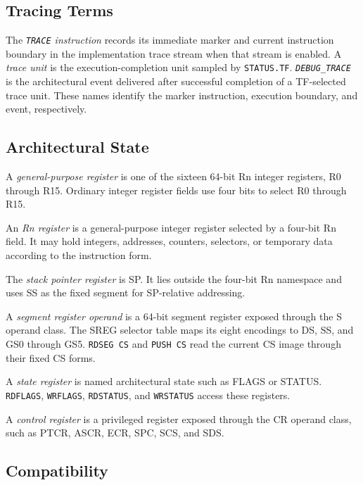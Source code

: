 \subsection{Tracing Terms}\label{section:tracing-terminology}

The \emph{\texttt{TRACE} instruction} records its immediate marker and current instruction boundary in the
implementation trace stream when that stream is enabled. A \emph{trace unit} is the execution-completion unit
sampled by \texttt{STATUS.TF}. \emph{\texttt{DEBUG\_TRACE}} is the architectural event delivered after successful
completion of a TF-selected trace unit. These names identify the marker instruction, execution boundary, and event,
respectively.

\subsection{Architectural State}\label{section:architectural-state-terminology}

A \emph{general-purpose register} is one of the sixteen 64-bit Rn integer registers, R0 through R15. Ordinary
integer register fields use four bits to select R0 through R15.

An \emph{Rn register} is a general-purpose integer register selected by a four-bit Rn field. It may hold integers,
addresses, counters, selectors, or temporary data according to the instruction form.

The \emph{stack pointer register} is SP. It lies outside the four-bit Rn namespace and uses SS as the fixed segment
for SP-relative addressing.

A \emph{segment register operand} is a 64-bit segment register exposed through the S operand class. The SREG selector
table maps its eight encodings to DS, SS, and GS0 through GS5. \texttt{RDSEG CS} and \texttt{PUSH CS} read the
current CS image through their fixed CS forms.

A \emph{state register} is named architectural state such as FLAGS or STATUS. \texttt{RDFLAGS}, \texttt{WRFLAGS},
\texttt{RDSTATUS}, and \texttt{WRSTATUS} access these registers.

A \emph{control register} is a privileged register exposed through the CR operand class, such as PTCR, ASCR, ECR,
SPC, SCS, and SDS.

\subsection{Compatibility}\label{section:compatibility-terminology}

